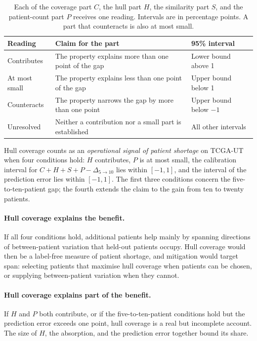\documentclass[11pt]{article}
\begin{document}
\begin{table}[htbp]
\centering
\renewcommand{\arraystretch}{1.15}
\begin{tabularx}{\textwidth}{@{}lYl@{}}
\toprule
Reading & Claim for the part & 95\% interval \\
\midrule
Contributes & The property explains more than one point of the gap & Lower bound above 1 \\
\addlinespace
At most small & The property explains less than one point of the gap & Upper bound below 1 \\
\addlinespace
Counteracts & The property narrows the gap by more than one point & Upper bound below $-1$ \\
\addlinespace
Unresolved & Neither a contribution nor a small part is established & All other intervals \\
\bottomrule
\end{tabularx}
\caption{Each of the coverage part $C$, the hull part $H$, the similarity part $S$, and the patient-count part $P$ receives one reading. Intervals are in percentage points. A part that counteracts is also at most small.}
\label{tab:readings}
\end{table}

\noindent Hull coverage counts as an \emph{operational signal of patient shortage} on TCGA-UT when four conditions hold: $H$ contributes, $P$ is at most small, the calibration interval for $C+H+S+P-\Delta_{5\to10}$ lies within $[-1,1]$, and the interval of the prediction error lies within $[-1,1]$. The first three conditions concern the five-to-ten-patient gap; the fourth extends the claim to the gain from ten to twenty patients.

\paragraph{Hull coverage explains the benefit.}
If all four conditions hold, additional patients help mainly by spanning directions of between-patient variation that held-out patients occupy. Hull coverage would then be a label-free measure of patient shortage, and mitigation would target span: selecting patients that maximise hull coverage when patients can be chosen, or supplying between-patient variation when they cannot.

\paragraph{Hull coverage explains part of the benefit.}
If $H$ and $P$ both contribute, or if the five-to-ten-patient conditions hold but the prediction error exceeds one point, hull coverage is a real but incomplete account. The size of $H$, the absorption, and the prediction error together bound its share.
\end{document}
